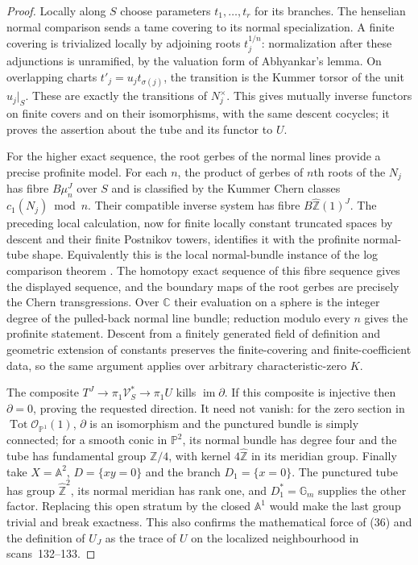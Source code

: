 \begin{proof}
Locally along $S$ choose parameters $t_1,\ldots,t_r$ for its branches.
The henselian normal comparison sends a tame covering to its normal
specialization. A finite covering is trivialized locally by adjoining
roots $t_j^{1/n}$: normalization after these adjunctions is unramified,
by the valuation form of Abhyankar's lemma. On overlapping charts
$t'_j=u_jt_{\sigma(j)}$, the transition is the Kummer torsor of the
unit $u_j|_S$. These are exactly the transitions of $N_j^\times$.
This gives mutually inverse functors on finite covers and on their
isomorphisms, with the same descent cocycles; it proves the assertion
about the tube and its functor to $U$.

For the higher exact sequence, the root gerbes of the normal lines
provide a precise profinite model. For each $n$, the product of gerbes
of $n$th roots of the $N_j$ has fibre $B\mu_n^J$ over $S$ and is
classified by the Kummer Chern classes $c_1(N_j)\bmod n$. Their
compatible inverse system has fibre $B\widehat{\mathbb Z}(1)^J$.
The preceding local calculation, now for finite locally constant
truncated spaces by descent and their finite Postnikov towers,
identifies it with the profinite normal-tube shape. Equivalently this
is the local normal-bundle instance of the log comparison theorem
\cite[Theorem~A and Corollary~5.5, preprint numbering]{CSST2019}.
The homotopy exact sequence of this fibre sequence gives the displayed
sequence, and the boundary maps of the root gerbes are precisely the
Chern transgressions. Over $\mathbb C$ their evaluation on a sphere
is the integer degree of the pulled-back normal line bundle; reduction
modulo every $n$ gives the profinite statement. Descent from a finitely
generated field of definition and geometric extension of constants
preserves the finite-covering and finite-coefficient data, so the same
argument applies over arbitrary characteristic-zero $K$.

The composite $T^J\to\pi_1\mathcal V_S^*\to\pi_1U$ kills
$\operatorname{im}\partial$. If this composite is injective then
$\partial=0$, proving the requested direction. It need not vanish:
for the zero section in $\operatorname{Tot}\mathcal O_{\mathbb P^1}(1)$,
$\partial$ is an isomorphism and the punctured bundle is simply
connected; for a smooth conic in $\mathbb P^2$, its normal bundle has
degree four and the tube has fundamental group $\mathbb Z/4$, with
kernel $4\widehat{\mathbb Z}$ in its meridian group. Finally take
$X=\mathbb A^2$, $D=\{xy=0\}$ and the branch $D_1=\{x=0\}$.
The punctured tube has group $\widehat{\mathbb Z}^2$, its normal
meridian has rank one, and $D_1^*=\mathbb G_m$ supplies the other
factor. Replacing this open stratum by the closed $\mathbb A^1$
would make the last group trivial and break exactness. This also
confirms the mathematical force of (36) and the definition of $U_J$
as the trace of $U$ on the localized neighbourhood in scans~132--133.
\end{proof}

